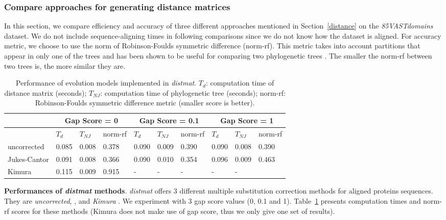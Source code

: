 \documentclass[11pt,letterpaper]{article}
\theoremstyle{definition}
\begin{document}
\subsubsection{Compare approaches for generating distance matrices}

In this section, we compare efficiency and accuracy of three different approaches mentioned in Section~\ref{distance} on the \textit{85VASTdomains} dataset. We do not include sequence-aligning times in following comparisons since we do not know how the dataset is aligned. For accuracy metric, we choose to use the norm of Robinson-Foulds symmetric difference (norm-rf). This metric takes into account partitions that appear in only one of the trees and has been shown to be useful for comparing two phylogenetic trees \cite{robinson1981comparison}. The smaller the norm-rf between two trees is, the more similar they are.

\begin{table}[h]
\centering
	\begin{tabular}{l|lll|lll|lll}
\multicolumn{1}{c}{} & \multicolumn{3}{c}{Gap Score = 0} & \multicolumn{3}{c}{Gap Score = 0.1} &  \multicolumn{3}{c}{Gap Score = 1} \\
\hline
&	$T_d$	& $T_{NJ}$	& norm-rf &	$T_d$	& $T_{NJ}$	& norm-rf &	$T_d$	& $T_{NJ}$	& norm-rf \\
\hline
uncorrected		&	0.085	&	0.008	&	0.378	&	0.090	&	0.009	&	0.390	&	0.090	&	0.008	&	0.390	\\
Jukes-Cantor	&	0.091	&	0.008	&	0.366	&	0.090	&	0.010	&	0.354	&	0.096	&	0.009	&	0.463	\\
Kimura 	&	0.115	&	0.009	&	0.915	&	-	&	-	&	-	&	-	&	-	&		\\
\hline
\end{tabular}
\caption{Performance of evolution models implemented in \textit{distmat}. $T_d$: computation time of distance matrix (seconds); $T_{NJ}$: computation time of phylogenetic tree (seconds); norm-rf: Robinson-Foulds symmetric difference metric (smaller score is better).
}\label{tab:dist1}
\end{table}

\textbf{Performances of \textit{distmat} methods}. \textit{distmat} offers 3 different multiple substitution correction methods for aligned proteins sequences. They are \textit{uncorrected},  \cite{jukes1969evolution}, and \textit{Kimura} \cite{kimura1980simple}. We experiment with 3 gap score values (0, 0.1 and 1). Table~\ref{tab:dist1} presents computation times and norm-rf scores for these methods (Kimura does not make use of gap score, thus we only give one set of results).
\end{document}
